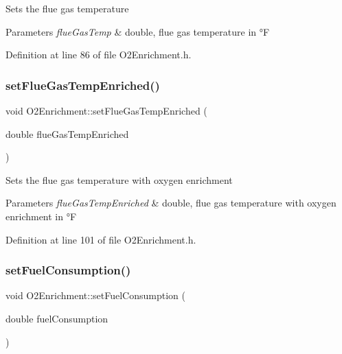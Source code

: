 Sets the flue gas temperature 
\begin{DoxyParams}{Parameters}
{\em flue\+Gas\+Temp} & double, flue gas temperature in °F \\
\hline
\end{DoxyParams}


Definition at line 86 of file O2\+Enrichment.\+h.

\mbox{\label{class_o2_enrichment_a787af9e47a73f2416d6c5d23aaf6d659}} 
\subsubsection{\texorpdfstring{set\+Flue\+Gas\+Temp\+Enriched()}{setFlueGasTempEnriched()}}
{\footnotesize\ttfamily void O2\+Enrichment\+::set\+Flue\+Gas\+Temp\+Enriched (\begin{DoxyParamCaption}\item[{double}]{flue\+Gas\+Temp\+Enriched }\end{DoxyParamCaption})\hspace{0.3cm}{\ttfamily [inline]}}

Sets the flue gas temperature with oxygen enrichment 
\begin{DoxyParams}{Parameters}
{\em flue\+Gas\+Temp\+Enriched} & double, flue gas temperature with oxygen enrichment in °F \\
\hline
\end{DoxyParams}


Definition at line 101 of file O2\+Enrichment.\+h.

\mbox{\label{class_o2_enrichment_ae2b7ed0ecf7b71b2a68f488c7760efaf}} 
\subsubsection{\texorpdfstring{set\+Fuel\+Consumption()}{setFuelConsumption()}}
{\footnotesize\ttfamily void O2\+Enrichment\+::set\+Fuel\+Consumption (\begin{DoxyParamCaption}\item[{double}]{fuel\+Consumption }\end{DoxyParamCaption})\hspace{0.3cm}{\ttfamily [inline]}}

